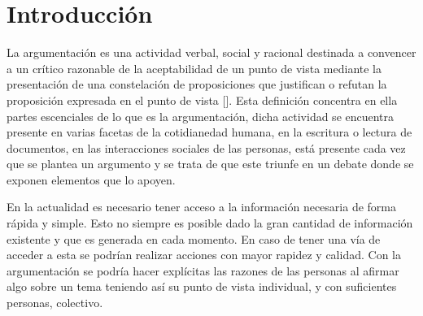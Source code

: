\chapter*{Introducción}\label{chapter:introduction}



La argumentación es una actividad verbal, social y racional destinada a convencer 
a un crítico razonable de la aceptabilidad de un punto de vista mediante la presentación 
de una constelación de proposiciones que justifican o refutan la proposición expresada 
en el punto de vista [\cite{van2004systematic}]. Esta definición concentra en ella 
partes escenciales de lo que es la argumentación, dicha actividad se encuentra presente
en varias facetas de la cotidianedad humana, en la escritura o lectura de documentos,
en las interacciones sociales de las personas, está presente cada vez que se
plantea un argumento y se trata de que este triunfe en un debate donde 
se exponen elementos que lo apoyen.   

En la actualidad es necesario tener acceso a la información necesaria
de forma rápida y simple. Esto no siempre es posible dado la gran cantidad de información existente y
que es generada en cada momento. En caso de tener una vía de acceder a esta se podrían realizar acciones
con mayor rapidez y calidad. Con la argumentación se podría hacer explícitas las razones de las personas 
al afirmar algo sobre un tema teniendo así su punto de vista individual, y con suficientes personas, colectivo.



